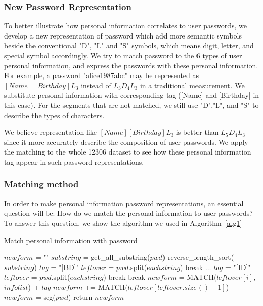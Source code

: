 \documentclass{sig-alternate}
\begin{document}
\subsubsection{New Password Representation}
To better illustrate how personal information correlates to user passwords, we develop a new representation of password which add more semantic symbols beside the conventional "D", "L" and "S" symbols, which means digit, letter, and special symbol accordingly. We try to match password to the 6 types of user personal information, and express the passwords with these personal information. For example, a password "alice1987abc" may be represented as $[Name][Birthday]L_3$ instead of $L_3D_4L_3$ in a traditional measurement. We substitute personal information with corresponding tag ([Name] and [Birthday] in this case). For the segments that are not matched, we still use "D","L", and "S" to describe the types of characters.

We believe representation like $[Name][Birthday]L_3$ is better than $L_5D_4L_3$ since it more accurately describe the composition of user passwords. We apply the matching to the whole 12306 dataset to see how these personal information tag appear in such password representations.

\subsubsection{Matching method}
In order to make personal information password representations, an essential question will be: How do we match the personal information to user passwords? To answer this question, we show the algorithm we used in Algorithm~\ref{alg1}

\begin{algorithm}
\caption{Match personal information with password}
\label{CHalgorithm}
\begin{algorithmic}[1]
\State $newform$ = ""
\State $substring$ = get\_all\_substring($pwd$)
\State reverse\_length\_sort($substring$)
\State $tag$ = "[BD]"
\State $leftover$ = $pwd$.split($eachstring$)
\State break
\EndIf
\State $\ldots$
\State $tag$ = "[ID]"
\State $leftover$ = $pwd$.split($eachstring$)
\State break
\EndIf
\Else
\State break
\EndIf
\EndFor
{}
\State $newform$ = 
\State MATCH($leftover[i]$,$infolist$) + $tag$
\EndFor
\State $newform$ += 
\State MATCH($leftover[leftover.size()-1]$)
\Else
\State $newform$ = seg($pwd$)
\EndIf
\State return $newform$
\EndProcedure
\end{algorithmic}
\label{alg1}
\end{algorithm}
\end{document}
